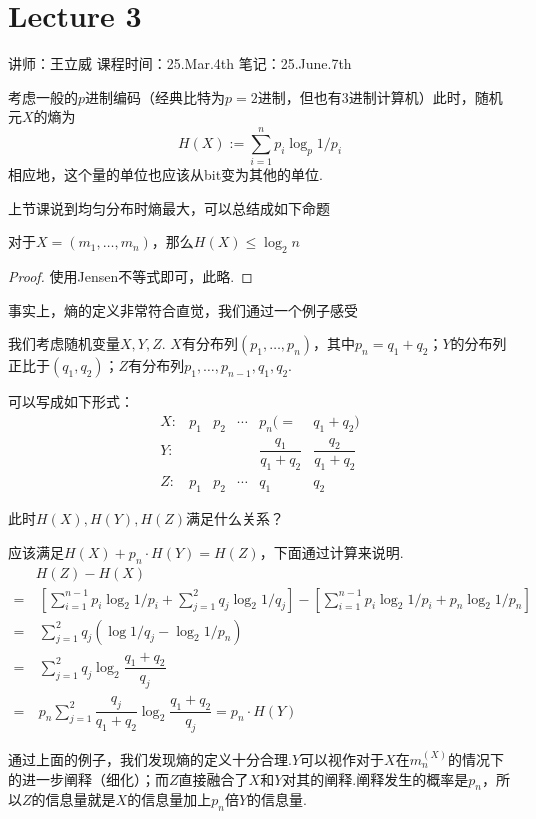 \chapter{Lecture 3}

\begin{center}
    讲师：王立威 \qquad
    课程时间：25.Mar.4th \qquad 
    笔记：25.June.7th
\end{center}

\bigskip

考虑一般的$p$进制编码（经典比特为$p=2$进制，但也有3进制计算机）此时，随机元$X$的熵为 
\[
H(X) := \sum_{i=1}^n p_i \log_p 1/p_i
\]
相应地，这个量的单位也应该从bit变为其他的单位. 

上节课说到均匀分布时熵最大，可以总结成如下命题
\begin{proposition}
    对于$X = (m_1, \dots, m_n)$，那么$H(X) \le \log_2 n$
\end{proposition}
\begin{proof}
    使用Jensen不等式即可，此略.
\end{proof}

事实上，熵的定义非常符合直觉，我们通过一个例子感受 
\begin{example}
    我们考虑随机变量$X,Y,Z$. $X$有分布列$(p_1,\dots, p_n)$，其中$p_n = q_1 + q_2$；$Y$的分布列正比于$(q_1, q_2)$；$Z$有分布列$p_1,\dots, p_{n-1}, q_1, q_2$. 

    可以写成如下形式：
    \[
    \begin{matrix}
        X: & p_1 & p_2 & \cdots & p_n(= & q_1 + q_2) \\
        Y: & \ & \ & \ & \dfrac{q_1}{q_1 + q_2} & \dfrac{q_2}{q_1 + q_2}  \\
        Z: & p_1 & p_2 & \cdots & q_1 & q_2
    \end{matrix}
    \]

    此时$H(X),H(Y),H(Z)$满足什么关系？
\end{example}
\begin{solution}
    应该满足$H(X) + p_n\cdot H(Y) = H(Z)$，下面通过计算来说明.
    \begin{align*}
        & H(Z) - H(X) \\
        = & \ \left[
            \sum_{i=1}^{n-1} p_i \log_2 1/p_i + \sum_{j=1}^2 q_j \log_2 1/q_j
        \right] - \left[
            \sum_{i=1}^{n-1} p_i \log_2 1/p_i + 
            p_n \log_2 1/p_n
        \right] \\
        = & \ \sum_{j=1}^2 q_j \left(
            \log 1/q_j - \log_2 1/p_n
        \right) \\
        = & \ \sum_{j=1}^2 q_j \log_2\dfrac{q_1 + q_2}{q_j} \\
        = & \ p_n \sum_{j=1}^2 \dfrac{q_j}{q_1 + q_2} \log_2\dfrac{q_1 + q_2}{q_j} = p_n \cdot H(Y)
    \end{align*}

    通过上面的例子，我们发现熵的定义十分合理.$Y$可以视作对于$X$在$m^{(X)}_n$的情况下的进一步阐释（细化）；而$Z$直接融合了$X$和$Y$对其的阐释.阐释发生的概率是$p_n$，所以$Z$的信息量就是$X$的信息量加上$p_n$倍$Y$的信息量.
\end{solution} 

